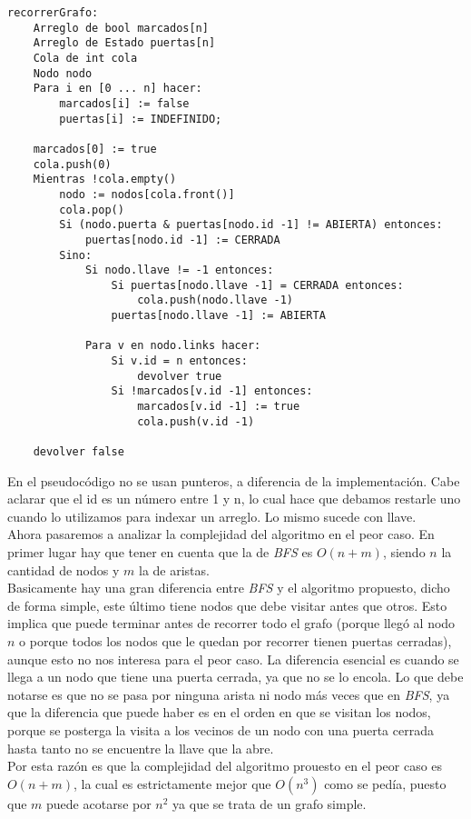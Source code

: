 \begin{verbatim}
recorrerGrafo:  
    Arreglo de bool marcados[n]
    Arreglo de Estado puertas[n]
    Cola de int cola
    Nodo nodo
    Para i en [0 ... n] hacer:
        marcados[i] := false
        puertas[i] := INDEFINIDO;

    marcados[0] := true
    cola.push(0)
    Mientras !cola.empty()
        nodo := nodos[cola.front()]
        cola.pop()
        Si (nodo.puerta & puertas[nodo.id -1] != ABIERTA) entonces:
            puertas[nodo.id -1] := CERRADA
        Sino:
            Si nodo.llave != -1 entonces:
                Si puertas[nodo.llave -1] = CERRADA entonces:
                    cola.push(nodo.llave -1)
                puertas[nodo.llave -1] := ABIERTA
            
            Para v en nodo.links hacer:
                Si v.id = n entonces:
                	devolver true
                Si !marcados[v.id -1] entonces:
                    marcados[v.id -1] := true
                    cola.push(v.id -1)

    devolver false
\end{verbatim}

En el pseudocódigo no se usan punteros, a diferencia de la implementación. Cabe aclarar que el id es un número entre 1 y n, lo cual hace que debamos restarle uno cuando lo utilizamos para indexar un arreglo. Lo mismo sucede con llave. \\
Ahora pasaremos a analizar la complejidad del algoritmo en el peor caso. En primer lugar hay que tener en cuenta que la de \textit{BFS} es $O(n+m)$, siendo $n$ la cantidad de nodos y $m$ la de aristas. \\
Basicamente hay una gran diferencia entre \textit{BFS} y el algoritmo propuesto, dicho de forma simple, este último tiene nodos que debe visitar antes que otros. Esto implica que puede terminar antes de recorrer todo el grafo (porque llegó al nodo $n$ o porque todos los nodos que le quedan por recorrer tienen puertas cerradas), aunque esto no nos interesa para el peor caso. La diferencia esencial es cuando se llega a un nodo que tiene una puerta cerrada, ya que no se lo encola. Lo que debe notarse es que no se pasa por ninguna arista ni nodo más veces que en \textit{BFS}, ya que la diferencia que puede haber es en el orden en que se visitan los nodos, porque se posterga la visita a los vecinos de un nodo con una puerta cerrada hasta tanto no se encuentre la llave que la abre. \\
Por esta razón es que la complejidad del algoritmo prouesto en el peor caso es $O(n+m)$, la cual es estrictamente mejor que $O(n^3)$ como se pedía, puesto que $m$ puede acotarse por $n^2$ ya que se trata de un grafo simple. \\